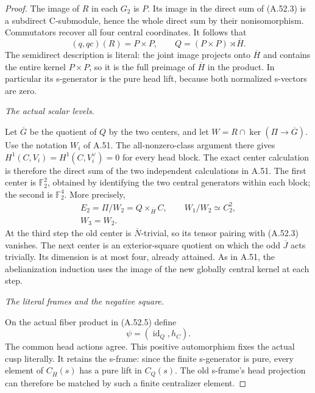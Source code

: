 \begin{proof}
The image of \(R\) in each \(G_2\) is \(P\).
Its image in the direct sum of (A.52.3) is a
subdirect C-submodule, hence the whole direct
sum by their nonisomorphism. Commutators recover
all four central coordinates. It follows that
\[
            (q,qc)(R)=P\times P,
            \qquad Q=(P\times P)\rtimes\overline H.
                                                               \tag{A.52.4}
\]
The semidirect description is literal: the joint
image projects onto \(\overline H\) and contains
the entire kernel \(P\times P\), so it is the
full preimage of \(\overline H\) in the product.
In particular its s-generator is the pure head
lift, because both normalized s-vectors are zero.

\emph{The actual scalar levels.}\par
Let \(\overline G\) be the quotient of \(Q\)
by the two centers, and let
\(W=R\cap\ker(\Pi\to\overline G)\).
Use the notation \(W_i\) of A.51.
The all-nonzero-class argument there gives
\(H^1(C,V_i)=H^1(C,V_i^\vee)=0\) for every
head block. The exact center calculation is
therefore the direct sum of the two independent
calculations in A.51. The first center is
\(\mathbb F_2^2\), obtained by identifying the
two central generators within each block; the
second is \(\mathbb F_2^4\). More precisely,
\[
\begin{gathered}
 E_2=\Pi/W_2=Q\times_{\overline H}C,\qquad
 W_1/W_2\simeq C_2^2,\\
                         W_3=W_2.
\end{gathered}                                       \tag{A.52.5}
\]
At the third step the old center is
\(\overline N\)-trivial, so its tensor pairing
with (A.52.3) vanishes. The next center is an
exterior-square quotient on which the odd
\(\overline J\) acts trivially. Its dimension
is at most four, already attained. As in A.51,
the abelianization induction uses the image of
the new globally central kernel at each step.

\emph{The literal frames and the negative square.}\par
On the actual fiber product in (A.52.5) define
\[
                         \psi=(\operatorname{id}_Q,h_C).
                                                               \tag{A.52.6}
\]
The common head actions agree. This positive
automorphism fixes the actual cusp literally.
It retains the s-frame: since the finite
s-generator is pure, every element of
\(C_{\overline H}(s)\) has a pure lift in
\(C_Q(s)\). The old s-frame's head projection
can therefore be matched by such a finite
centralizer element.


\end{proof}
